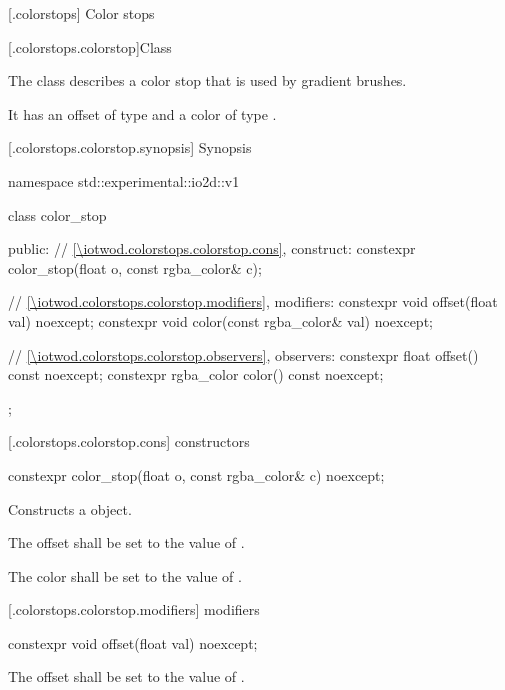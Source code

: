 [\iotwod.colorstops] {Color stops}

 [\iotwod.colorstops.colorstop]{Class }

\pnum
{}%
The class  describes a color stop that is used by gradient brushes.

\pnum
It has an offset of type  and a color of type .

 [\iotwod.colorstops.colorstop.synopsis] { Synopsis}

\begin{codeblock}
namespace std::experimental::io2d::v1 {
  class color_stop {
  public:
  	// \ref{\iotwod.colorstops.colorstop.cons}, construct:
    constexpr color_stop(float o, const rgba_color& c);
    
    // \ref{\iotwod.colorstops.colorstop.modifiers}, modifiers:
    constexpr void offset(float val) noexcept;
	constexpr void color(const rgba_color& val) noexcept;
	
    // \ref{\iotwod.colorstops.colorstop.observers}, observers:
	constexpr float offset() const noexcept;
	constexpr rgba_color color() const noexcept;
  };
}
\end{codeblock}

 [\iotwod.colorstops.colorstop.cons]{ constructors}

%
\begin{itemdecl}
constexpr color_stop(float o, const rgba_color& c) noexcept;
\end{itemdecl}
\begin{itemdescr}
\pnum
\effects
Constructs a  object.

\pnum
The offset shall be set to the value of .

\pnum
The color shall be set to the value of .
\end{itemdescr}

 [\iotwod.colorstops.colorstop.modifiers]{ modifiers}

%
\begin{itemdecl}
constexpr void offset(float val) noexcept;
\end{itemdecl}
\begin{itemdescr}
	\pnum
	\effects
	The offset shall be set to the value of .
\end{itemdescr}

